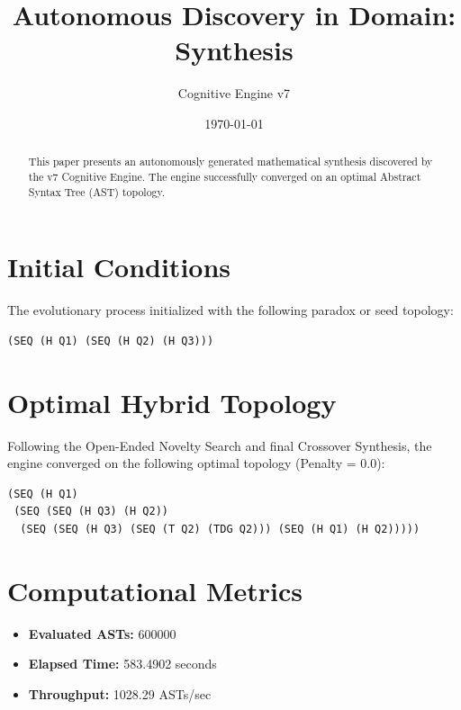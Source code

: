 \documentclass{article}
\title{Autonomous Discovery in Domain: Synthesis}
\author{Cognitive Engine v7}
\date{\today}
\begin{document}
\maketitle
\begin{abstract}
This paper presents an autonomously generated mathematical synthesis discovered by the v7 Cognitive Engine. The engine successfully converged on an optimal Abstract Syntax Tree (AST) topology.\end{abstract}
\section{Initial Conditions}
The evolutionary process initialized with the following paradox or seed topology:
\begin{verbatim}
(SEQ (H Q1) (SEQ (H Q2) (H Q3)))
\end{verbatim}
\section{Optimal Hybrid Topology}
Following the Open-Ended Novelty Search and final Crossover Synthesis, the engine converged on the following optimal topology (Penalty = 0.0):
\begin{verbatim}
(SEQ (H Q1)
 (SEQ (SEQ (H Q3) (H Q2))
  (SEQ (SEQ (H Q3) (SEQ (T Q2) (TDG Q2))) (SEQ (H Q1) (H Q2)))))
\end{verbatim}
\section{Computational Metrics}
\begin{itemize}
  \item \textbf{Evaluated ASTs:} 600000
  \item \textbf{Elapsed Time:} 583.4902 seconds
  \item \textbf{Throughput:} 1028.29 ASTs/sec
\end{itemize}
\end{document}
